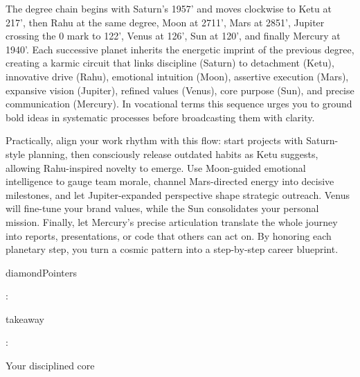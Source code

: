 {\fontsize{9}{13}\selectfont The degree chain begins with Saturn's 19\textdegree{}57' and moves clockwise to Ketu at 21\textdegree{}7', then Rahu at the same degree, Moon at 27\textdegree{}11', Mars at 28\textdegree{}51', Jupiter crossing the 0\textdegree{} mark to 1\textdegree{}22', Venus at 1\textdegree{}26', Sun at 12\textdegree{}0', and finally Mercury at 19\textdegree{}40'. Each successive planet inherits the energetic imprint of the previous degree, creating a karmic circuit that links discipline (Saturn) to detachment (Ketu), innovative drive (Rahu), emotional intuition (Moon), assertive execution (Mars), expansive vision (Jupiter), refined values (Venus), core purpose (Sun), and precise communication (Mercury). In vocational terms this sequence urges you to ground bold ideas in systematic processes before broadcasting them with clarity.}\par\vspace{1.8mm}

{\fontsize{9}{13}\selectfont Practically, align your work rhythm with this flow: start projects with Saturn-style planning, then consciously release outdated habits as Ketu suggests, allowing Rahu-inspired novelty to emerge. Use Moon-guided emotional intelligence to gauge team morale, channel Mars-directed energy into decisive milestones, and let Jupiter-expanded perspective shape strategic outreach. Venus will fine-tune your brand values, while the Sun consolidates your personal mission. Finally, let Mercury's precise articulation translate the whole journey into reports, presentations, or code that others can act on. By honoring each planetary step, you turn a cosmic pattern into a step-by-step career blueprint.}\par\vspace{1.8mm}

{\fontsize{9}{13}\selectfont diamondPointers}\par\vspace{1.8mm}

{\fontsize{9}{13}\selectfont :}\par\vspace{1.8mm}

{\fontsize{9}{13}\selectfont takeaway}\par\vspace{1.8mm}

{\fontsize{9}{13}\selectfont :}\par\vspace{1.8mm}

{\fontsize{9}{13}\selectfont Your disciplined core}\par\vspace{1.8mm}


